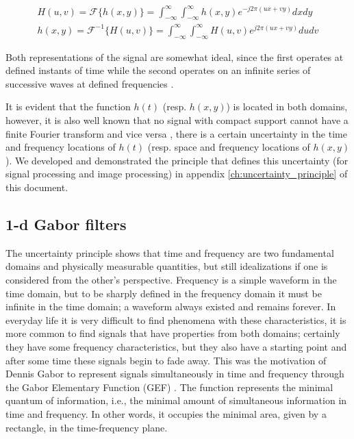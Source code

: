 \begin{equation}\label{eq:fourier_transforms_2d}
    \begin{gathered}
        H(u, v) = \mathcal{F}\{h(x, y)\} = \int_{-\infty}^{\infty} \int_{-\infty}^{\infty} h(x, y) e^{-j2\pi (ux + vy)} dx dy \\
        h(x, y) = \mathcal{F}^{-1}\{H(u, v)\} = \int_{-\infty}^{\infty} \int_{-\infty}^{\infty}  H(u, v) e^{j2\pi (ux + vy)} du dv 
    \end{gathered}
\end{equation}

Both representations of the signal are somewhat ideal, since the first operates at defined instants of time while the second operates on an infinite series of successive waves at defined frequencies \citep{Gabor:JIEE:1946}. 

It is evident that the function $h(t)$ (resp. $h(x, y)$) is located in both domains, however, it is also well known that no signal with compact support cannot have a finite Fourier transform and vice versa \citep{Bracewell:FourierBook:1999}, there is a certain uncertainty in the time and frequency locations of $h(t)$ (resp. space and frequency locations of $h(x, y)$). We developed and demonstrated the principle that defines this uncertainty (for signal processing and image processing) in appendix \ref{ch:uncertainty_principle} of this document.

\subsection{1-d Gabor filters}
The uncertainty principle shows that time and frequency are two fundamental domains and physically measurable quantities, but still idealizations if one is considered from the other's perspective.
Frequency is a simple waveform in the time domain, but to be sharply defined in the frequency domain it must be infinite in the time domain; a waveform always existed and remains forever. In everyday life it is very difficult to find phenomena with these characteristics, it is more common to find signals that have properties from both domains; certainly they have some frequency characteristics, but they also have a starting point and after some time these signals begin to fade away. This was the motivation of Dennis Gabor to represent signals simultaneously in time and frequency through the Gabor Elementary Function (GEF) \citep{Gabor:JIEE:1946}. The function represents the minimal quantum of information, i.e., the minimal amount of simultaneous information in time and frequency. In other words, it occupies the minimal area, given by a rectangle, in the time-frequency plane.  

